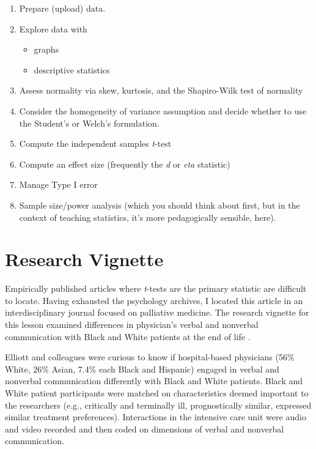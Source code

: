 \documentclass[
  11pt,
]{book}
\providecommand{\tightlist}{%
  \setlength{\itemsep}{0pt}\setlength{\parskip}{0pt}}
\begin{document}
\begin{enumerate}
\def\labelenumi{\arabic{enumi}.}
\tightlist
\item
  Prepare (upload) data.
\item
  Explore data with

  \begin{itemize}
  \tightlist
  \item
    graphs
  \item
    descriptive statistics
  \end{itemize}
\item
  Assess normality via skew, kurtosis, and the Shapiro-Wilk test of normality
\item
  Consider the homogeneity of variance assumption and decide whether to use the Student's or Welch's formulation.
\item
  Compute the independent samples \emph{t}-test
\item
  Compute an effect size (frequently the \emph{d} or \emph{eta} statistic)
\item
  Manage Type I error
\item
  Sample size/power analysis (which you should think about first, but in the context of teaching statistics, it's more pedagogically sensible, here).
\end{enumerate}

\hypertarget{research-vignette-2}{%
\section{Research Vignette}\label{research-vignette-2}}

Empirically published articles where \emph{t}-tests are the primary statistic are difficult to locate. Having exhausted the psychology archives, I located this article in an interdisciplinary journal focused on palliative medicine. The research vignette for this lesson examined differences in physician's verbal and nonverbal communication with Black and White patients at the end of life \citep{elliott_differences_2016}.

Elliott and colleagues \citeyearpar{elliott_differences_2016} were curious to know if hospital-based physicians (56\% White, 26\% Asian, 7.4\% each Black and Hispanic) engaged in verbal and nonverbal communication differently with Black and White patients. Black and White patient participants were matched on characteristics deemed important to the researchers (e.g., critically and terminally ill, prognostically similar, expressed similar treatment preferences). Interactions in the intensive care unit were audio and video recorded and then coded on dimensions of verbal and nonverbal communication.
\end{document}
